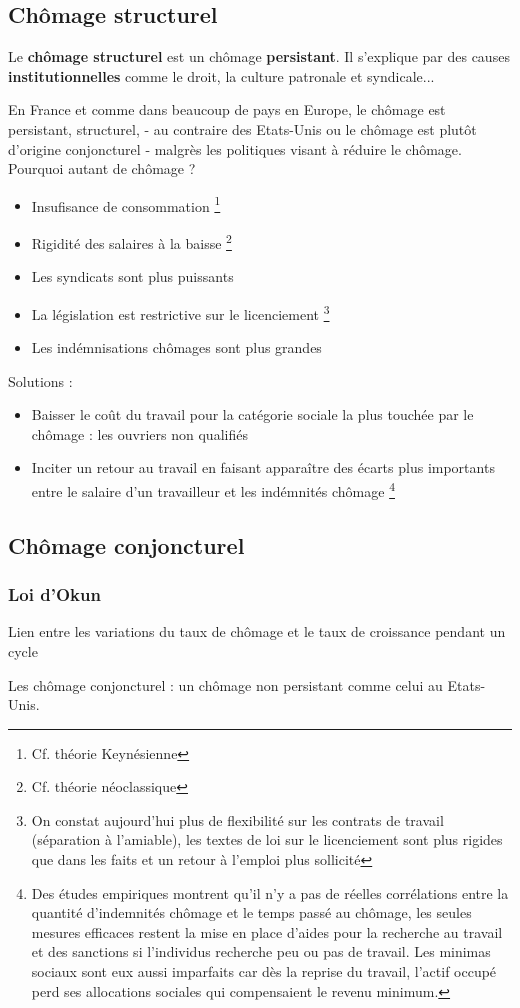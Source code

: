 \subsection{Chômage structurel}
Le \textbf{chômage structurel} est un chômage \textbf{persistant}. Il s'explique par des causes \textbf{institutionnelles} comme le droit, la culture patronale et syndicale...
\newline

En France et comme dans beaucoup de pays en Europe, le chômage est persistant, structurel, - au contraire des Etats-Unis ou le chômage est plutôt d'origine conjoncturel - malgrès les politiques visant à réduire le chômage. Pourquoi autant de chômage ?
\begin{itemize}
    \item Insufisance de consommation \footnote{Cf. théorie Keynésienne}
    \item Rigidité des salaires à la baisse \footnote{Cf. théorie néoclassique}
    \item Les syndicats sont plus puissants
    \item La législation est restrictive sur le licenciement \footnote{On constat aujourd'hui plus de flexibilité sur les contrats de travail (séparation à l'amiable), les textes de loi sur le licenciement sont plus rigides que dans les faits et un retour à l'emploi plus sollicité}
    \item Les indémnisations chômages sont plus grandes
\end{itemize}
Solutions :
\begin{itemize}
    \item Baisser le coût du travail pour la catégorie sociale la plus touchée par le chômage : les ouvriers non qualifiés
    \item Inciter un retour au travail en faisant apparaître des écarts plus importants entre le salaire d'un travailleur et les indémnités chômage 
    \footnote{Des études empiriques montrent qu'il n'y a pas de réelles corrélations entre la quantité d'indemnités chômage et le temps passé au chômage, les seules mesures efficaces restent la mise en place d'aides pour la recherche au travail et des sanctions si l'individus recherche peu ou pas de travail. Les minimas sociaux sont eux aussi imparfaits car dès la reprise du travail, l'actif occupé perd ses allocations sociales qui compensaient le revenu minimum.}
\end{itemize}
\newpage
\subsection{Chômage conjoncturel}
\subsubsection{Loi d'Okun}
Lien entre les variations du taux de chômage et le taux de croissance pendant un cycle \newline

Les chômage conjoncturel : un chômage non persistant comme celui au Etats-Unis.